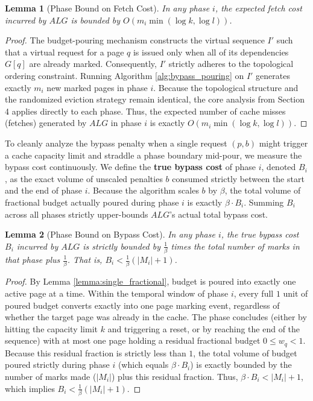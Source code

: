 \documentclass[a4paper]{article}
\newtheorem{lemma}{Lemma}      %
\begin{document}
\begin{lemma}[Phase Bound on Fetch Cost]
\label{lemma:fetch_cost_bound}
In any phase $i$, the expected fetch cost incurred by $ALG$ is bounded by $O\left(m_i \min(\log k, \log l)\right)$.
\end{lemma}
\begin{proof}
The budget-pouring mechanism constructs the virtual sequence $I'$ such that a virtual request for a page $q$ is issued only when all of its dependencies $G[q]$ are already marked. Consequently, $I'$ strictly adheres to the topological ordering constraint. Running Algorithm \ref{alg:bypass_pouring} on $I'$ generates exactly $m_i$ new marked pages in phase $i$. Because the topological structure and the randomized eviction strategy remain identical, the core analysis from Section 4 applies directly to each phase. Thus, the expected number of cache misses (fetches) generated by $ALG$ in phase $i$ is exactly $O\left(m_i \min(\log k, \log l)\right)$.
\end{proof}

To cleanly analyze the bypass penalty when a single request $(p, b)$ might trigger a cache capacity limit and straddle a phase boundary mid-pour, we measure the bypass cost continuously. We define the \textbf{true bypass cost} of phase $i$, denoted $B_i$, as the exact volume of unscaled penalties $b$ consumed strictly between the start and the end of phase $i$. Because the algorithm scales $b$ by $\beta$, the total volume of fractional budget actually poured during phase $i$ is exactly $\beta \cdot B_i$. Summing $B_i$ across all phases strictly upper-bounds $ALG$'s actual total bypass cost.

\begin{lemma}[Phase Bound on Bypass Cost]
\label{lemma:bypass_cost_bound}
In any phase $i$, the true bypass cost $B_i$ incurred by $ALG$ is strictly bounded by $\frac{1}{\beta}$ times the total number of marks in that phase plus $\frac{1}{\beta}$. That is, $B_i < \frac{1}{\beta}(|M_i| + 1)$.
\end{lemma}
\begin{proof}
By Lemma \ref{lemma:single_fractional}, budget is poured into exactly one active page at a time. Within the temporal window of phase $i$, every full $1$ unit of poured budget converts exactly into one page marking event, regardless of whether the target page was already in the cache. The phase concludes (either by hitting the capacity limit $k$ and triggering a reset, or by reaching the end of the sequence) with at most one page holding a residual fractional budget $0 \le w_q < 1$. Because this residual fraction is strictly less than $1$, the total volume of budget poured strictly during phase $i$ (which equals $\beta \cdot B_i$) is exactly bounded by the number of marks made ($|M_i|$) plus this residual fraction. Thus, $\beta \cdot B_i < |M_i| + 1$, which implies $B_i < \frac{1}{\beta}(|M_i| + 1)$.
\end{proof}
\end{document}
